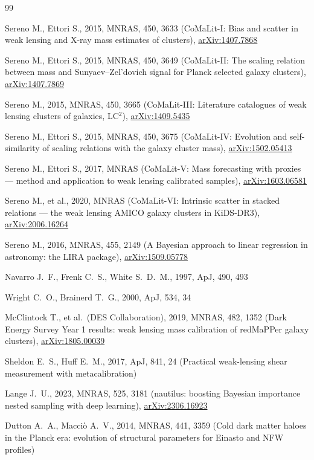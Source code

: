 \documentclass[11pt,a4paper]{article}
\begin{document}
\begin{thebibliography}{99}

Sereno M., Ettori S., 2015, MNRAS, 450, 3633
(CoMaLit-I: Bias and scatter in weak lensing and X-ray mass estimates of
clusters), \href{https://arxiv.org/abs/1407.7868}{arXiv:1407.7868}

Sereno M., Ettori S., 2015, MNRAS, 450, 3649
(CoMaLit-II: The scaling relation between mass and Sunyaev--Zel'dovich
signal for Planck selected galaxy clusters),
\href{https://arxiv.org/abs/1407.7869}{arXiv:1407.7869}

Sereno M., 2015, MNRAS, 450, 3665
(CoMaLit-III: Literature catalogues of weak lensing clusters of galaxies,
LC$^2$), \href{https://arxiv.org/abs/1409.5435}{arXiv:1409.5435}

Sereno M., Ettori S., 2015, MNRAS, 450, 3675
(CoMaLit-IV: Evolution and self-similarity of scaling relations with the
galaxy cluster mass),
\href{https://arxiv.org/abs/1502.05413}{arXiv:1502.05413}

Sereno M., Ettori S., 2017, MNRAS
(CoMaLit-V: Mass forecasting with proxies --- method and application to
weak lensing calibrated samples),
\href{https://arxiv.org/abs/1603.06581}{arXiv:1603.06581}

Sereno M., et al., 2020, MNRAS
(CoMaLit-VI: Intrinsic scatter in stacked relations --- the weak lensing
AMICO galaxy clusters in KiDS-DR3),
\href{https://arxiv.org/abs/2006.16264}{arXiv:2006.16264}

Sereno M., 2016, MNRAS, 455, 2149
(A Bayesian approach to linear regression in astronomy: the LIRA package),
\href{https://arxiv.org/abs/1509.05778}{arXiv:1509.05778}

Navarro J.~F., Frenk C.~S., White S.~D.~M., 1997, ApJ, 490, 493

Wright C.~O., Brainerd T.~G., 2000, ApJ, 534, 34

McClintock T., et al.\ (DES Collaboration), 2019, MNRAS, 482, 1352
(Dark Energy Survey Year 1 results: weak lensing mass calibration of
redMaPPer galaxy clusters),
\href{https://arxiv.org/abs/1805.00039}{arXiv:1805.00039}

Sheldon E.~S., Huff E.~M., 2017, ApJ, 841, 24
(Practical weak-lensing shear measurement with metacalibration)

Lange J.~U., 2023, MNRAS, 525, 3181
(nautilus: boosting Bayesian importance nested sampling with deep
learning), \href{https://arxiv.org/abs/2306.16923}{arXiv:2306.16923}

Dutton A.~A., Macci\`o A.~V., 2014, MNRAS, 441, 3359
(Cold dark matter haloes in the Planck era: evolution of structural
parameters for Einasto and NFW profiles)

\end{thebibliography}
\end{document}
